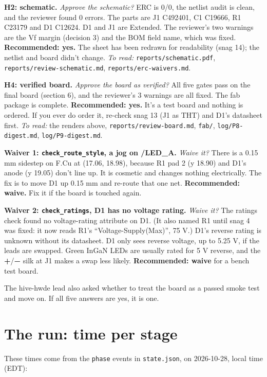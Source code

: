 \documentclass[
  10pt,
]{article}
\begin{document}
\textbf{H2: schematic.} \emph{Approve the schematic?} ERC is 0/0, the
netlist audit is clean, and the reviewer found 0 errors. The parts are
J1 C492401, C1 C19666, R1 C23179 and D1 C12624. D1 and J1 are Extended.
The reviewer's two warnings are the Vf margin (decision 3) and the BOM
field name, which was fixed. \textbf{Recommended: yes.} The sheet has
been redrawn for readability (snag 14); the netlist and board didn't
change. \emph{To read:} \texttt{reports/schematic.pdf},
\texttt{reports/review-schematic.md}, \texttt{reports/erc-waivers.md}.

\textbf{H4: verified board.} \emph{Approve the board as verified?} All
five gates pass on the final board (section 6), and the reviewer's 3
warnings are all fixed. The fab package is complete.
\textbf{Recommended: yes.} It's a test board and nothing is ordered. If
you ever do order it, re-check snag 13 (J1 as THT) and D1's datasheet
first. \emph{To read:} the renders above,
\texttt{reports/review-board.md}, \texttt{fab/},
\texttt{log/P8-digest.md}, \texttt{log/P9-digest.md}.

\textbf{Waiver 1: \texttt{check\_route\_style}, a jog on /LED\_A.}
\emph{Waive it?} There is a 0.15 mm sidestep on F.Cu at (17.06, 18.98),
because R1 pad 2 (y 18.90) and D1's anode (y 19.05) don't line up. It is
cosmetic and changes nothing electrically. The fix is to move D1 up 0.15
mm and re-route that one net. \textbf{Recommended: waive.} Fix it if the
board is touched again.

\textbf{Waiver 2: \texttt{check\_ratings}, D1 has no voltage rating.}
\emph{Waive it?} The ratings check found no voltage-rating attribute on
D1. (It also named R1 until snag 4 was fixed: it now reads R1's
``Voltage-Supply(Max)'', 75 V.) D1's reverse rating is unknown without
its datasheet. D1 only sees reverse voltage, up to 5.25 V, if the leads
are swapped. Green InGaN LEDs are usually rated for 5 V reverse, and the
\textbf{+}/\textbf{−} silk at J1 makes a swap less likely.
\textbf{Recommended: waive} for a bench test board.

The hive-hwde lead also asked whether to treat the board as a passed
smoke test and move on. If all five answers are yes, it is one.

\section{The run: time per stage}\label{the-run-time-per-stage}

These times come from the \texttt{phase} events in \texttt{state.json},
on 2026-10-28, local time (EDT):
\end{document}
